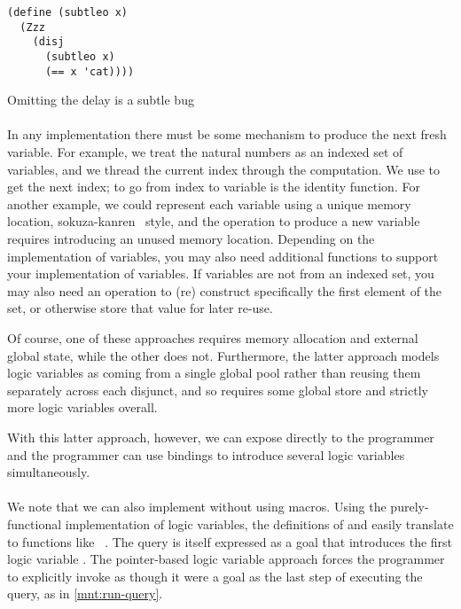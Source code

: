 \documentclass[sigplan,balance,pbalance,natbib=false]{acmart}
\begin{document}
\begin{listing}
  \begin{verbatim}
(define (subtleo x)
  (Zzz
    (disj
      (subtleo x)
      (== x 'cat))))
  \end{verbatim}
  \caption{Omitting the delay is a subtle bug}\label{mnt:subtleo}
\end{listing}

\paragraph{}

In any implementation there must be some mechanism to produce the next
fresh variable. For example, we treat the natural numbers as an
indexed set of variables, and we thread the current index through the
computation. We use  to get the next index; to go
from index to variable is the identity function. For another example,
we could represent each variable using a unique memory location,
sokuza-kanren~\cite{kiselyov2006taste} style, and the operation to
produce a new variable requires introducing an unused memory location.
Depending on the implementation of variables, you may also need
additional functions to support your implementation of variables. If
variables are not from an indexed set, you may also need an operation
to (re) construct specifically the first element of the set, or
otherwise store that value for later re-use.

Of course, one of these approaches requires memory allocation and
external global state, while the other does not. Furthermore, the
latter approach models logic variables as coming from a single global
pool rather than reusing them separately across each disjunct, and so
requires some global store and strictly more logic variables overall.

With this latter approach, however, we can expose 
directly to the programmer and the programmer can use 
bindings to introduce several logic variables simultaneously.

\paragraph{}

We note that we can also implement  without using
macros. Using the purely-functional implementation of logic variables,
the definitions of  and  easily
translate to functions
like ~\cite{hemann2013muKanren}. The
query is itself expressed as a goal that introduces the first logic
variable . The pointer-based logic variable approach
forces the programmer to explicitly invoke  as
though it were a goal as the last step of executing the query, as in
\cref{mnt:run-query}.
\end{document}

